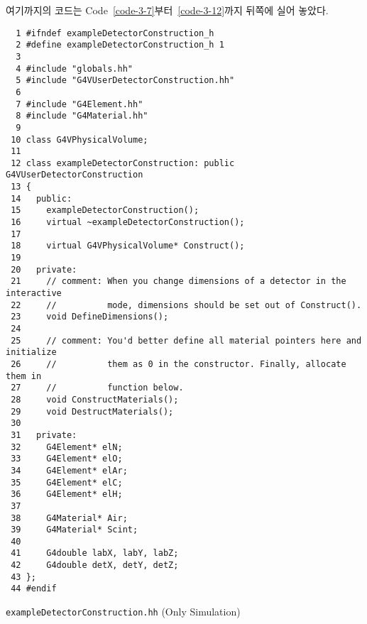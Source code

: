 여기까지의 코드는 Code~\ref{code-3-7}부터~\ref{code-3-12}까지 뒤쪽에 실어
놓았다.

\begin{code}[p]
\begin{lstlisting}
  1 #ifndef exampleDetectorConstruction_h
  2 #define exampleDetectorConstruction_h 1
  3 
  4 #include "globals.hh"
  5 #include "G4VUserDetectorConstruction.hh"
  6 
  7 #include "G4Element.hh"
  8 #include "G4Material.hh"
  9 
 10 class G4VPhysicalVolume;
 11 
 12 class exampleDetectorConstruction: public G4VUserDetectorConstruction
 13 {
 14   public:
 15     exampleDetectorConstruction();
 16     virtual ~exampleDetectorConstruction();
 17 
 18     virtual G4VPhysicalVolume* Construct();
 19 
 20   private:
 21     // comment: When you change dimensions of a detector in the interactive
 22     //          mode, dimensions should be set out of Construct().
 23     void DefineDimensions();
 24 
 25     // comment: You'd better define all material pointers here and initialize
 26     //          them as 0 in the constructor. Finally, allocate them in
 27     //          function below.
 28     void ConstructMaterials();
 29     void DestructMaterials();
 30 
 31   private:
 32     G4Element* elN;
 33     G4Element* elO;
 34     G4Element* elAr;
 35     G4Element* elC;
 36     G4Element* elH;
 37 
 38     G4Material* Air;
 39     G4Material* Scint;
 40 
 41     G4double labX, labY, labZ;
 42     G4double detX, detY, detZ;
 43 };
 44 #endif
\end{lstlisting}
\caption{\texttt{exampleDetectorConstruction.hh} (Only Simulation) \label{code-3-7}}
\end{code}

